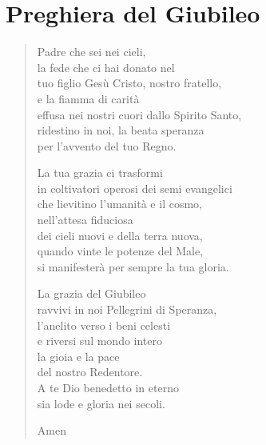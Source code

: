 \section{Preghiera del Giubileo}

\begin{verse}
Padre che sei nei cieli, \\
la fede che ci hai donato nel \\
tuo figlio Gesù Cristo, nostro fratello, \\
e la fiamma di carità \\
effusa nei nostri cuori dallo Spirito Santo, \\
ridestino in noi, la beata speranza \\
per l'avvento del tuo Regno.


La tua grazia ci trasformi \\
in coltivatori operosi dei semi evangelici \\
che lievitino l'umanità e il cosmo, \\
nell'attesa fiduciosa \\
dei cieli nuovi e della terra nuova, \\
quando vinte le potenze del Male, \\
si manifesterà per sempre la tua gloria.


La grazia del Giubileo \\
ravvivi in noi Pellegrini di Speranza, \\
l'anelito verso i beni celesti \\
e riversi sul mondo intero \\
la gioia e la pace \\
del nostro Redentore. \\
A te Dio benedetto in eterno \\
sia lode e gloria nei secoli.

Amen
\end{verse}


